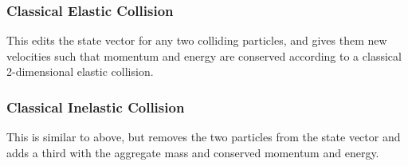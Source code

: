 \documentclass[11pt]{article}
\begin{document}
\subsubsection{Classical Elastic Collision}
This edits the state vector for any two colliding particles, and gives them new velocities such that momentum and energy are conserved according to a classical 2-dimensional elastic collision.

\subsubsection{Classical Inelastic Collision}
This is similar to above, but removes the two particles from the state vector and adds a third with the aggregate mass and conserved momentum and energy.
\end{document}
